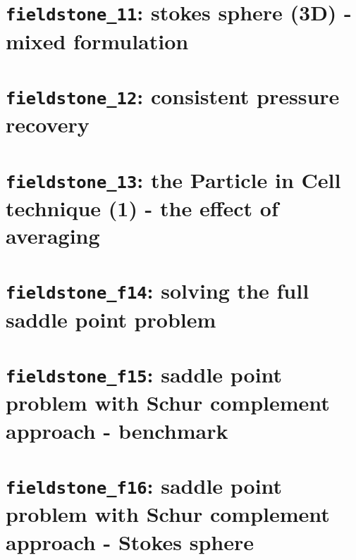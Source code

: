 \documentclass[a4paper]{article}
\begin{document}
\newpage
\section{{\tt fieldstone\_11}: stokes sphere (3D) - mixed formulation \label{f11}}


\newpage
\section{{\tt fieldstone\_12}: consistent pressure recovery \label{f12}}


\newpage
\section{{\tt fieldstone\_13}: the Particle in Cell technique (1) - the effect of averaging \label{f13}}


\newpage
\section{{\tt fieldstone\_f14}: solving the full saddle point problem \label{f14}}


\newpage
\section{{\tt fieldstone\_f15}: saddle point problem with Schur complement approach - benchmark \label{f15}}


\newpage
\section{{\tt fieldstone\_f16}: saddle point problem with Schur complement approach - Stokes sphere \label{f16}}

\end{document}
